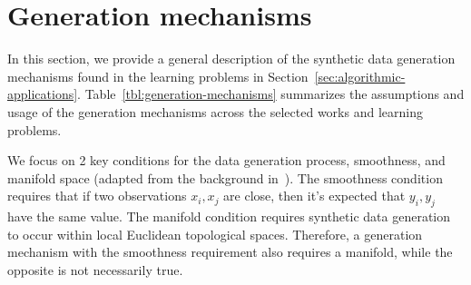 \section{Generation mechanisms}\label{sec:generation-mechanisms}

In this section, we provide a general description of the synthetic data
generation mechanisms found in the learning problems in
Section~\ref{sec:algorithmic-applications}.
Table~\ref{tbl:generation-mechanisms} summarizes the assumptions and usage of
the generation mechanisms across the selected works and learning problems.

We focus on 2 key conditions for the data generation process, smoothness, and
manifold space (adapted from the background in~\cite{van2020survey}). The
smoothness condition requires that if two observations $x_i, x_j$ are close,
then it's expected that $y_i, y_j$ have the same value.  The manifold
condition requires synthetic data generation to occur within local Euclidean
topological spaces. Therefore, a generation mechanism with the smoothness
requirement also requires a manifold, while the opposite is not necessarily
true.

